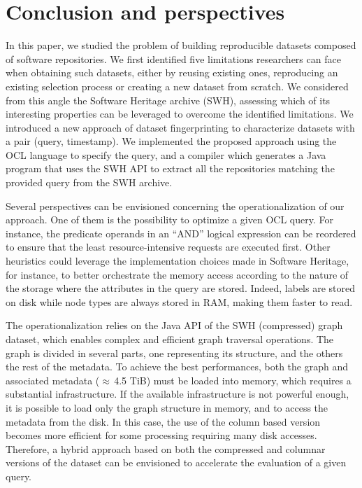 \section{Conclusion and perspectives}
\label{sec:conclusion}
In this paper, we studied the problem of building reproducible datasets composed of software repositories.
We first identified five limitations researchers can face when obtaining such datasets, either by reusing existing ones, reproducing an existing selection process or creating a new dataset from scratch.
We considered from this angle the Software Heritage archive (SWH), assessing which of its interesting properties can be leveraged to overcome the identified limitations.
We introduced a new approach of dataset fingerprinting to characterize datasets with a pair (query, timestamp).
We implemented the proposed approach using the OCL language to specify the query, and a compiler which generates a Java program that uses the SWH API to extract all the repositories matching the provided query from the SWH archive.

Several perspectives can be envisioned concerning the operationalization of our approach.
One of them is the possibility to optimize a given OCL query. 
For instance, the predicate operands in an ``AND'' logical expression can be reordered to ensure that the least resource-intensive requests are executed first. 
Other heuristics could leverage the implementation choices made in Software Heritage, for instance, to better orchestrate the memory access according to the nature of the storage where the attributes in the query are stored. 
Indeed, labels are stored on disk while node types are always stored in RAM, making them faster to read.

The operationalization relies on the Java API of the SWH (compressed) graph dataset, which enables complex and efficient graph traversal operations. 
The graph is divided in several parts, one representing its structure, and the others the rest of the metadata.
To achieve the best performances, both the graph and associated metadata ($\approx$\,4.5 TiB) must be loaded into memory, which requires a substantial infrastructure. 
If the available infrastructure is not powerful enough, it is possible to load only the graph structure in memory, and to access the metadata from the disk.
In this case, the use of the column based version becomes more efficient for some processing requiring many disk accesses. 
Therefore, a hybrid approach based on both the compressed and columnar versions of the dataset can be envisioned to accelerate the evaluation of a given query.

